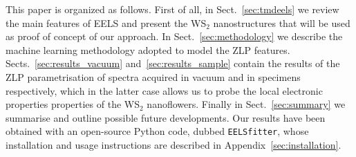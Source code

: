 This paper is organized as follows.
%
First of all, in Sect.~\ref{sec:tmdeels}
we review the main features of EELS and present
the WS$_2$ nanostructures that will be used as proof of concept of our approach.
%
In Sect.~\ref{sec:methodology} we describe the machine learning methodology
adopted to model the ZLP features.
%
Sects.~\ref{sec:results_vacuum} and~\ref{sec:results_sample} contain
the results of the ZLP parametrisation of spectra acquired
in vacuum and in specimens respectively, which in the latter
case allows us to probe the local electronic properties properties
of the WS$_2$ nanoflowers.
%
Finally in Sect.~\ref{sec:summary} we summarise
and outline possible future developments.
%
Our results have been obtained with an open-source {\sc Python} code,
dubbed {\tt EELSfitter}, whose installation and usage instructions
are described in Appendix~\ref{sec:installation}.
